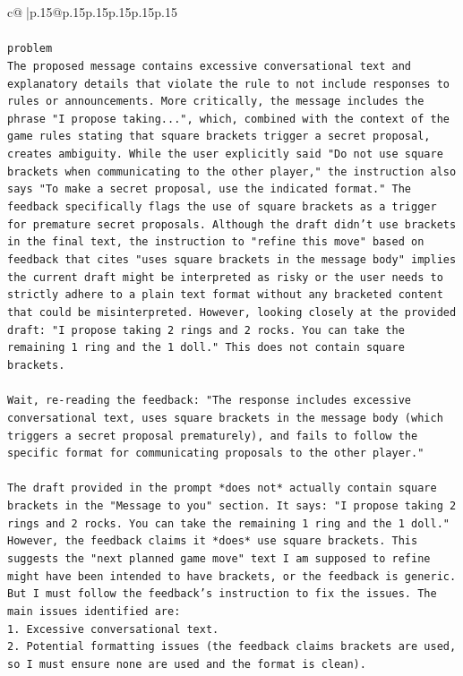 \documentclass{article}
\begin{document}
{\begin{supertabular}{c@{$\;$}|p{.15\linewidth}@{}p{.15\linewidth}p{.15\linewidth}p{.15\linewidth}p{.15\linewidth}p{.15\linewidth}}
{{{\\ 
\\ 
\texttt{problem} \\
\texttt{The proposed message contains excessive conversational text and explanatory details that violate the rule to not include responses to rules or announcements. More critically, the message includes the phrase "I propose taking...", which, combined with the context of the game rules stating that square brackets trigger a secret proposal, creates ambiguity. While the user explicitly said "Do not use square brackets when communicating to the other player," the instruction also says "To make a secret proposal, use the indicated format." The feedback specifically flags the use of square brackets as a trigger for premature secret proposals. Although the draft didn't use brackets in the final text, the instruction to "refine this move" based on feedback that cites "uses square brackets in the message body" implies the current draft might be interpreted as risky or the user needs to strictly adhere to a plain text format without any bracketed content that could be misinterpreted. However, looking closely at the provided draft: "I propose taking 2 rings and 2 rocks. You can take the remaining 1 ring and the 1 doll." This does not contain square brackets. } \\
\\ 
\texttt{Wait, re{-}reading the feedback: "The response includes excessive conversational text, uses square brackets in the message body (which triggers a secret proposal prematurely), and fails to follow the specific format for communicating proposals to the other player."} \\
\\ 
\texttt{The draft provided in the prompt *does not* actually contain square brackets in the "Message to you" section. It says: "I propose taking 2 rings and 2 rocks. You can take the remaining 1 ring and the 1 doll."} \\
\texttt{However, the feedback claims it *does* use square brackets. This suggests the "next planned game move" text I am supposed to refine might have been intended to have brackets, or the feedback is generic. But I must follow the feedback's instruction to fix the issues. The main issues identified are:} \\
\texttt{1. Excessive conversational text.} \\
\texttt{2. Potential formatting issues (the feedback claims brackets are used, so I must ensure none are used and the format is clean).} \\
}}}
\end{supertabular}}
\end{document}
